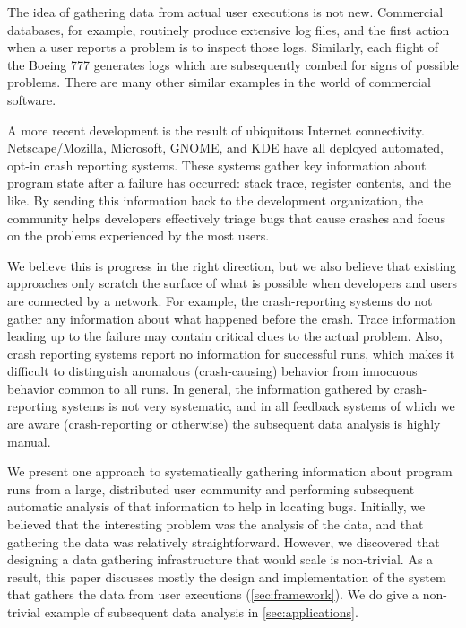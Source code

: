 The idea of gathering data from actual user executions is not new.
Commercial databases, for example, routinely produce extensive log
files, and the first action when a user reports a problem is to
inspect those logs.  Similarly, each flight of the Boeing 777
generates logs which are subsequently combed for signs of possible
problems.  There are many other similar examples in the world of
commercial software.

A more recent development is the result of ubiquitous Internet
connectivity.  Netscape/Mozilla, Microsoft, GNOME, and KDE have all
deployed automated, opt-in crash reporting systems.  These systems
gather key information about program state after a failure has
occurred: stack trace, register contents, and the like.  By sending
this information back to the development organization, the community
helps developers effectively triage bugs that cause crashes and focus
on the problems experienced by the most users.

We believe this is progress in the right direction, but we also
believe that existing approaches only scratch the surface of what is
possible when developers and users are connected by a network.  For
example, the crash-reporting systems do not gather any information
about what happened before the crash.  Trace information leading up to
the failure may contain critical clues to the actual problem.  Also,
crash reporting systems report no information for successful runs,
which makes it difficult to distinguish anomalous (crash-causing)
behavior from innocuous behavior common to all runs.  In general, the
information gathered by crash-reporting systems is not very
systematic, and in all feedback systems of which we are aware
(crash-reporting or otherwise) the subsequent data analysis is highly
manual.

We present one approach to systematically gathering information about
program runs from a large, distributed user community and performing
subsequent automatic analysis of that information to help in locating
bugs.  Initially, we believed that the interesting problem was the
analysis of the data, and that gathering the data was relatively
straightforward.  However, we discovered that designing a data
gathering infrastructure that would scale is non-trivial.  As a
result, this paper discusses mostly the design and implementation of
the system that gathers the data from user executions
(\autoref{sec:framework}). We do give a non-trivial example of
subsequent data analysis in \autoref{sec:applications}.

